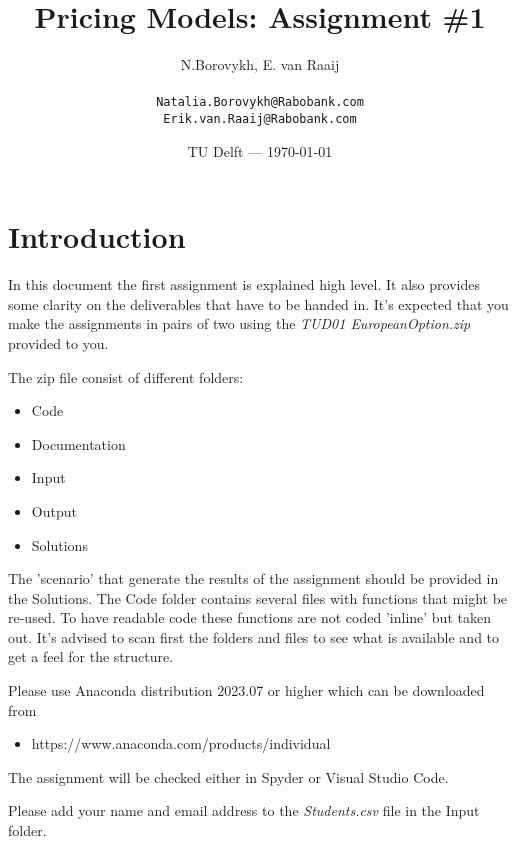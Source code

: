 \documentclass{article}
\title{Pricing Models: Assignment \#1} %
\author{N.Borovykh, E. van Raaij\\  \\ \texttt{Natalia.Borovykh@Rabobank.com} \\ \texttt{Erik.van.Raaij@Rabobank.com}} %
\date{TU Delft --- \today} %
\begin{document}
\maketitle %


\section*{Introduction} %

In this document the first assignment is explained high level. It also provides some clarity on the deliverables that have to be handed in. 
It's expected that you make the assignments in pairs of two using the \textit{TUD01 EuropeanOption.zip} provided to you.



\begin{info} %
The zip file consist of different folders:
\begin{itemize}
  \item Code
  \item Documentation
  \item Input
  \item Output
  \item Solutions
\end{itemize}	
\end{info}
The 'scenario' that generate the results of the assignment should be provided in the Solutions. 
The Code folder contains several files with functions that might be re-used. 
To have readable code these functions are not coded 'inline' but taken out. 
It's advised to scan first the folders and files to see what is available and to get a feel for the structure.

\begin{info} %
Please use Anaconda distribution 2023.07 or higher which can be downloaded from
\begin{itemize}
    \item https://www.anaconda.com/products/individual
\end{itemize}
The assignment will be checked either in Spyder or Visual Studio Code.
\end{info}
\begin{warn}[Deliverable 01:]
  Please add your name and email address to the \textit{Students.csv} file in the Input folder.
\end{warn}
\end{document}
